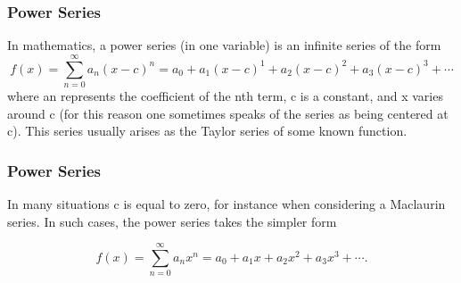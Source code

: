 \documentclass{beamer}
\begin{document}
\begin{frame}
\frametitle{Power Series}



In mathematics, a power series (in one variable) is an infinite series of the form
\[f(x) = \sum_{n=0}^\infty a_n \left( x-c \right)^n = a_0 + a_1 (x-c)^1 + a_2 (x-c)^2 + a_3 (x-c)^3 + \cdots\]
where an represents the coefficient of the nth term, c is a constant, and x varies around c (for this reason one sometimes speaks of the series as being centered at c). This series usually arises as the Taylor series of some known function.
\end{frame}

\begin{frame}
\frametitle{Power Series}
In many situations c is equal to zero, for instance when considering a Maclaurin series. In such cases, the power series takes the simpler form

\[f(x) = \sum_{n=0}^\infty a_n x^n = a_0 + a_1 x + a_2 x^2 + a_3 x^3 + \cdots.\]


\end{frame}
\end{document}

